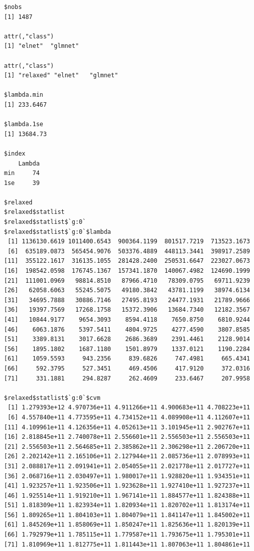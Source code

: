 \documentclass[
]{article}
\begin{document}
\begin{verbatim}
$nobs
[1] 1487

attr(,"class")
[1] "elnet"  "glmnet"

attr(,"class")
[1] "relaxed" "elnet"   "glmnet" 

$lambda.min
[1] 233.6467

$lambda.1se
[1] 13684.73

$index
    Lambda
min     74
1se     39

$relaxed
$relaxed$statlist
$relaxed$statlist$`g:0`
$relaxed$statlist$`g:0`$lambda
 [1] 1136130.6619 1011400.6543  900364.1199  801517.7219  713523.1673
 [6]  635189.0873  565454.9076  503376.4889  448113.3441  398917.2589
[11]  355122.1617  316135.1055  281428.2400  250531.6647  223027.0673
[16]  198542.0598  176745.1367  157341.1870  140067.4982  124690.1999
[21]  111001.0969   98814.8510   87966.4710   78309.0795   69711.9239
[26]   62058.6063   55245.5075   49180.3842   43781.1199   38974.6134
[31]   34695.7888   30886.7146   27495.8193   24477.1931   21789.9666
[36]   19397.7569   17268.1758   15372.3906   13684.7340   12182.3567
[41]   10844.9177    9654.3093    8594.4118    7650.8750    6810.9244
[46]    6063.1876    5397.5411    4804.9725    4277.4590    3807.8585
[51]    3389.8131    3017.6628    2686.3689    2391.4461    2128.9014
[56]    1895.1802    1687.1180    1501.8979    1337.0121    1190.2284
[61]    1059.5593     943.2356     839.6826     747.4981     665.4341
[66]     592.3795     527.3451     469.4506     417.9120     372.0316
[71]     331.1881     294.8287     262.4609     233.6467     207.9958

$relaxed$statlist$`g:0`$cvm
 [1] 1.279393e+12 4.970736e+11 4.911266e+11 4.900683e+11 4.708223e+11
 [6] 4.557840e+11 4.773595e+11 4.734152e+11 4.089908e+11 4.112607e+11
[11] 4.109961e+11 4.126356e+11 4.052613e+11 3.101945e+11 2.902767e+11
[16] 2.818845e+11 2.740078e+11 2.556601e+11 2.556503e+11 2.556503e+11
[21] 2.556503e+11 2.564685e+11 2.385862e+11 2.306298e+11 2.206720e+11
[26] 2.202142e+11 2.165106e+11 2.127944e+11 2.085736e+11 2.078993e+11
[31] 2.088817e+11 2.091941e+11 2.054055e+11 2.021778e+11 2.017727e+11
[36] 2.068716e+11 2.030497e+11 1.980017e+11 1.928820e+11 1.934351e+11
[41] 1.923257e+11 1.923506e+11 1.923628e+11 1.927410e+11 1.927237e+11
[46] 1.925514e+11 1.919210e+11 1.967141e+11 1.884577e+11 1.824388e+11
[51] 1.818309e+11 1.823934e+11 1.820934e+11 1.820702e+11 1.813174e+11
[56] 1.809265e+11 1.804103e+11 1.804079e+11 1.841147e+11 1.845002e+11
[61] 1.845269e+11 1.858069e+11 1.850247e+11 1.825636e+11 1.820139e+11
[66] 1.792979e+11 1.785115e+11 1.779587e+11 1.793675e+11 1.795301e+11
[71] 1.810969e+11 1.812775e+11 1.811443e+11 1.807063e+11 1.804861e+11


\end{verbatim}
\end{document}
